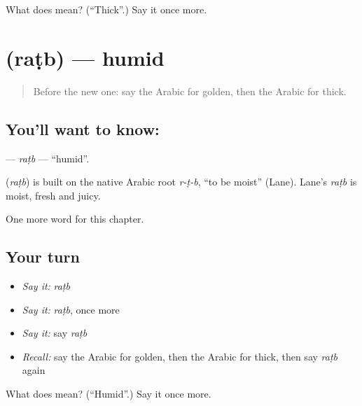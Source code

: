 \begin{tcolorbox}[breakable,colback=teal!4,colframe=teal!35!black,title={Before you move on}]
What does  mean? (\textquotedblleft{}Thick\textquotedblright{}.) Say it once more.
\end{tcolorbox}
\section[\texorpdfstring{\ar{رطب} (raṭb)}{رطب (raṭb)}]{ (raṭb) — humid}

\label{lesson:AR-C179-ratb}



\begin{quote}
Before the new one: say the Arabic for golden, then the Arabic for thick.
\end{quote}

\subsection*{You'll want to know: }
\textbf{} — \emph{raṭb} — \textquotedblleft{}humid\textquotedblright{}.

\begin{cousinweb}
\textbf{} (\emph{raṭb}) is built on the native Arabic root \emph{r-ṭ-b}, \textquotedblleft{}to be moist\textquotedblright{} (Lane). Lane's \emph{raṭb} is moist, fresh and juicy.
\end{cousinweb}

\begin{grammarlens}[title={What you've built}]
One more word for this chapter.
\end{grammarlens}

\subsection*{Your turn}
\begin{itemize}
\raggedright
  \item \emph{Say it:} \emph{raṭb}
  \item \emph{Say it:} \emph{raṭb}, once more
  \item \emph{Say it:} say \emph{raṭb}
  \item \emph{Recall:} say the Arabic for golden, then the Arabic for thick, then say \emph{raṭb} again
\end{itemize}

\begin{tcolorbox}[breakable,colback=teal!4,colframe=teal!35!black,title={Before you move on}]
What does  mean? (\textquotedblleft{}Humid\textquotedblright{}.) Say it once more.
\end{tcolorbox}
